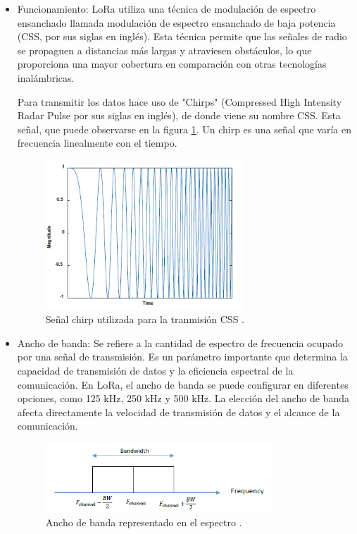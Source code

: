 \begin{itemize}
    \item Funcionamiento: LoRa utiliza una técnica de modulación de espectro ensanchado llamada modulación de espectro ensanchado de baja potencia (CSS, por sus siglas en inglés). Esta técnica permite que las señales de radio se propaguen a distancias más largas y atraviesen obstáculos, lo que proporciona una mayor cobertura en comparación con otras tecnologías inalámbricas.
    
    Para transmitir los datos hace uso de "Chirps" (Compressed High Intensity Radar Pulse por sus siglas en inglés), de donde viene su nombre CSS. Esta señal, que puede observarse en la figura \ref{fig:chirp}. Un chirp es una señal que varía en frecuencia linealmente con el tiempo.

    \begin{figure}[H]
        \centering
        \includegraphics[width = 0.7\textwidth]{imagenes/cap1_marcoteo/ChripSignal.png}
        \caption{Señal chirp utilizada para la tranmisión CSS \citep{aloufi2020hybrid}.}
        \label{fig:chirp}
    \end{figure}

    \item Ancho de banda: Se refiere a la cantidad de espectro de frecuencia ocupado por una señal de transmisión. Es un parámetro importante que determina la capacidad de transmisión de datos y la eficiencia espectral de la comunicación. En LoRa, el ancho de banda se puede configurar en diferentes opciones, como 125 kHz, 250 kHz y 500 kHz. La elección del ancho de banda afecta directamente la velocidad de transmisión de datos y el alcance de la comunicación.
    
    \begin{figure}[H]
        \centering
        \includegraphics[width = 0.8\textwidth]{imagenes/cap1_marcoteo/AnchodeBandaLoRa.png}
        \caption{Ancho de banda representado en el espectro \citep{aloufi2020hybrid}.}
        \label{fig:anchobanda}
    \end{figure}


\end{itemize}
